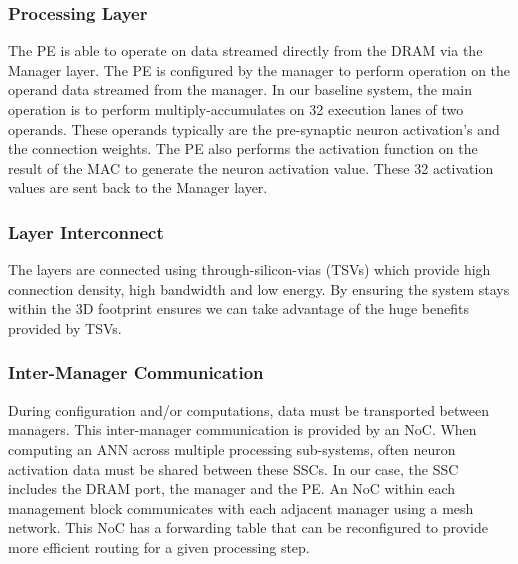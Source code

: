 \documentclass[journal]{IEEEtran}
\begin{document}
\subsubsection{Processing Layer}
\label{ssec:Processing Layer}
The PE is able to operate on data streamed directly from the DRAM via the Manager layer. The PE is configured by the manager to perform operation on the operand data streamed from the manager. In our baseline system, the main operation is to perform multiply-accumulates on 32 execution lanes of two operands. These operands typically are the pre-synaptic neuron activation's and the connection weights. The PE also performs the activation function on the result of the MAC to generate the neuron activation value. These 32 activation values are sent back to the Manager layer.

\subsubsection{Layer Interconnect}
\label{ssec:Layer Interconnect}

The layers are connected using through-silicon-vias (TSVs) which provide high connection density, high bandwidth and low energy.
By ensuring the system stays within the 3D footprint ensures we can take advantage of the huge benefits provided by TSVs.

\subsubsection{Inter-Manager Communication}
\label{ssec:Inter-Manager Communication}

During configuration and/or computations, data must be transported between managers. This inter-manager communication is provided by an NoC.
When computing an ANN across multiple processing sub-systems, often neuron activation data must be shared between these SSCs. In our case, the SSC includes the DRAM port, the manager and the PE. An NoC within each management block communicates with each adjacent manager using a mesh network. This NoC has a forwarding table that can be reconfigured to provide more efficient routing for a given processing step.
\end{document}
